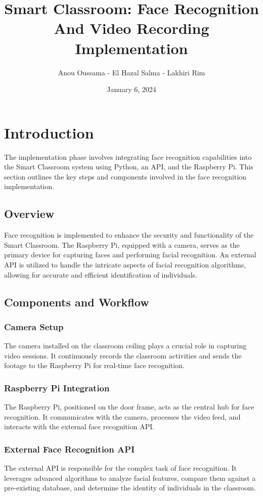 \documentclass[11pt]{article}
\title{\textbf{Smart Classroom: Face Recognition And Video Recording Implementation}}
\author{Anou Oussama - El Hazal Salma - Lakhiri Rim}
\date{January 6, 2024}
\begin{document}
	\maketitle
	
	\section{Introduction}
	\quad The implementation phase involves integrating face recognition capabilities into the Smart Classroom system using Python, an API, and the Raspberry Pi. This section outlines the key steps and components involved in the face recognition implementation.
	
	\hspace{1cm} \subsection{Overview}
	\quad Face recognition is implemented to enhance the security and functionality of the Smart Classroom. The Raspberry Pi, equipped with a camera, serves as the primary device for capturing faces and performing facial recognition. An external API is utilized to handle the intricate aspects of facial recognition algorithms, allowing for accurate and efficient identification of individuals.
	
	\subsection{Components and Workflow}
	\subsubsection{Camera Setup}
	The camera installed on the classroom ceiling plays a crucial role in capturing video sessions. It continuously records the classroom activities and sends the footage to the Raspberry Pi for real-time face recognition.
	
	\subsubsection{Raspberry Pi Integration}
	The Raspberry Pi, positioned on the door frame, acts as the central hub for face recognition. It communicates with the camera, processes the video feed, and interacts with the external face recognition API.
	
	\subsubsection{External Face Recognition API}
	The external API is responsible for the complex task of face recognition. It leverages advanced algorithms to analyze facial features, compare them against a pre-existing database, and determine the identity of individuals in the classroom.
	
\end{document}
